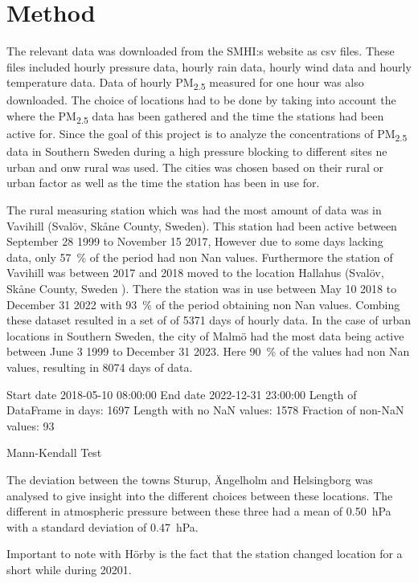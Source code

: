 \newpage
\section{Method}
The relevant data was downloaded from the SMHI:s website as csv files. These files included hourly pressure data, hourly rain data, hourly wind data and hourly temperature data. Data of hourly PM\textsubscript{2.5} measured for one hour was also downloaded. The choice of locations had to be done by taking into account the where the PM\textsubscript{2.5} data has been gathered and the time the stations had been active for. Since the goal of this project is to analyze the concentrations of PM\textsubscript{2.5} data in Southern Sweden during a high pressure blocking to different sites ne urban and onw rural was used. The cities was chosen based on their rural or urban factor as well as the time the station has been in use for. 

The rural measuring station which was had the most amount of data was in Vavihill (Svalöv, Skåne County, Sweden). This station had been active between September 28 1999 to November 15 2017, However due to some days lacking data, only \SI{57}{\%} of the period had non Nan values. Furthermore the station of Vavihill was between 2017 and 2018 moved to the location Hallahus (Svalöv, Skåne County, Sweden ). There the station was in use between May 10 2018 to December 31 2022 with \SI{93}{\%} of the period obtaining non Nan values. Combing these dataset resulted in a set of of 5371 days of hourly data. In the case of urban locations in Southern Sweden, the city of Malmö had the most data being active between June 3 1999 to December 31 2023. Here \SI{90}{\%} of the values had non Nan values, resulting in 8074 days of data. 



Start date 2018-05-10 08:00:00
 End date 2022-12-31 23:00:00
Length of DataFrame in days: 1697
Length with no NaN values: 1578
Fraction of non-NaN values: 93%

Mann-Kendall Test 


The deviation between the towns Sturup, Ängelholm and Helsingborg was analysed to give insight into the different choices between these locations. The different in atmospheric pressure between these three had a mean of \SI{0.50}{\hecto\pascal} with a standard deviation of \SI{0.47}{\hecto\pascal}. 



Important to note with Hörby is the fact that the station changed location for a short while during 20201. 

